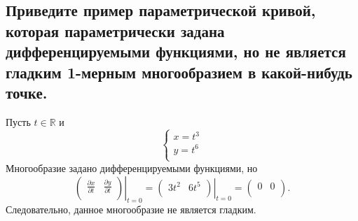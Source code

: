 \subsection{Приведите пример параметрической кривой, которая параметрически задана дифференцируемыми функциями, но не является гладким 1-мерным многообразием в какой-нибудь точке.}
Пусть $t \in \mathbb{R}$ и
\[
    \begin{cases}
        x = t^3 \\
        y = t^6 \\
    \end{cases}
\]
Многообразие задано дифференцируемыми функциями, но
\[
    \left.
        \begin{pmatrix}
            \frac{\partial x}{\partial t}
            & \frac{\partial y}{\partial t}\\
        \end{pmatrix}
    \right|_{t=0} =
    \left.
        \begin{pmatrix}
            3t^2
            &
            6t^5
            \\
        \end{pmatrix}
    \right|_{t=0} =
    \begin{pmatrix}
        0 & 0\\
    \end{pmatrix}.
\]
Следовательно, данное многообразие не является гладким.